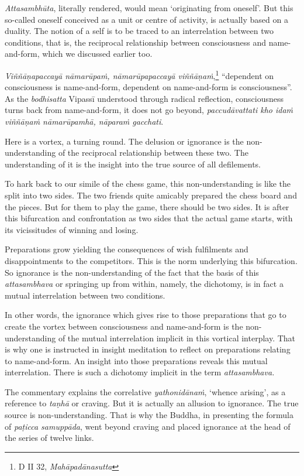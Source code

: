 \emph{Attasambhūta}, literally rendered, would mean `originating from oneself'. But this so-called oneself conceived as a unit or centre of activity, is actually based on a duality. The notion of a self is to be traced to an interrelation between two conditions, that is, the reciprocal relationship between consciousness and name-and-form, which we discussed earlier too.

\emph{Viññāṇapaccayā nāmarūpaṁ, nāmarūpapaccayā viññāṇaṁ},\footnote{D II 32, \emph{Mahāpadānasutta}} ``dependent on consciousness is name-and-form, dependent on name-and-form is consciousness''. As the \emph{bodhisatta} Vipassī understood through radical reflection, consciousness turns back from name-and-form, it does not go beyond, \emph{paccudāvattati kho idaṁ viññāṇaṁ nāmarūpamhā, nāparaṁ gacchati}.

Here is a vortex, a turning round. The delusion or ignorance is the non-understanding of the reciprocal relationship between these two. The understanding of it is the insight into the true source of all defilements.

To hark back to our simile of the chess game, this non-understanding is like the split into two sides. The two friends quite amicably prepared the chess board and the pieces. But for them to play the game, there should be two sides. It is after this bifurcation and confrontation as two sides that the actual game starts, with its vicissitudes of winning and losing.

Preparations grow yielding the consequences of wish fulfilments and disappointments to the competitors. This is the norm underlying this bifurcation. So ignorance is the non-understanding of the fact that the basis of this \emph{attasambhava} or springing up from within, namely, the dichotomy, is in fact a mutual interrelation between two conditions.

In other words, the ignorance which gives rise to those preparations that go to create the vortex between consciousness and name-and-form is the non-understanding of the mutual interrelation implicit in this vortical interplay. That is why one is instructed in insight meditation to reflect on preparations relating to name-and-form. An insight into those preparations reveals this mutual interrelation. There is such a dichotomy implicit in the term \emph{attasambhava.}

The commentary explains the correlative \emph{yathonidānaṁ}, `whence arising', as a reference to \emph{taṇhā} or craving. But it is actually an allusion to ignorance. The true source is non-understanding. That is why the Buddha, in presenting the formula of \emph{paṭicca samuppāda}, went beyond craving and placed ignorance at the head of the series of twelve links.

